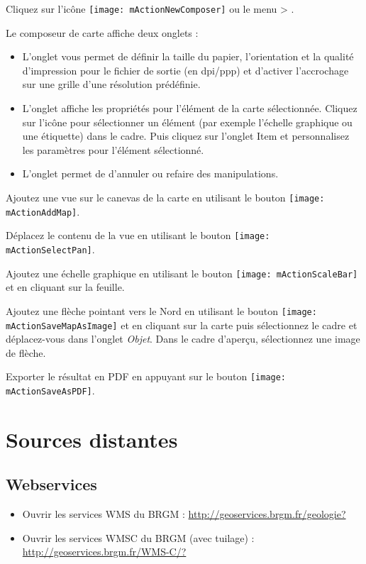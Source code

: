 Cliquez sur l'icône \texttt{[image: mActionNewComposer]} ou le menu  > .

Le composeur de carte affiche deux onglets :

\begin{itemize}[label=--]
\item L'onglet  vous permet de définir la taille du papier, l'orientation et la qualité d'impression pour le fichier de sortie (en dpi/ppp) et d'activer l'accrochage sur une grille d'une résolution prédéfinie.
\item L'onglet  affiche les propriétés pour l'élément de la carte sélectionnée. Cliquez sur l'icône   pour sélectionner un élément (par exemple l'échelle graphique ou une étiquette) dans le cadre. Puis cliquez sur l'onglet Item et personnalisez les paramètres pour l'élément sélectionné.
\item L'onglet  permet de d'annuler ou refaire des manipulations.
\end{itemize}

Ajoutez une vue sur le canevas de la carte en utilisant le bouton \texttt{[image: mActionAddMap]}.

Déplacez le contenu de la vue en utilisant le bouton \texttt{[image: mActionSelectPan]}.

Ajoutez une échelle graphique en utilisant le bouton \texttt{[image: mActionScaleBar]} et en cliquant sur la feuille.

Ajoutez une flèche pointant vers le Nord en utilisant le bouton \texttt{[image: mActionSaveMapAsImage]} et en cliquant sur la carte puis sélectionnez le cadre et déplacez-vous dans l'onglet \textit{Objet}. Dans le cadre d'aperçu, sélectionnez une image de flèche.

Exporter le résultat en PDF en appuyant sur le bouton \texttt{[image: mActionSaveAsPDF]}.

\section{Sources distantes}
\subsection{Webservices}
\begin{itemize}[label=--]
\item Ouvrir les services WMS du BRGM : \url{http://geoservices.brgm.fr/geologie?}
\item Ouvrir les services WMSC du BRGM (avec tuilage) : \url{http://geoservices.brgm.fr/WMS-C/?}
\end{itemize}


